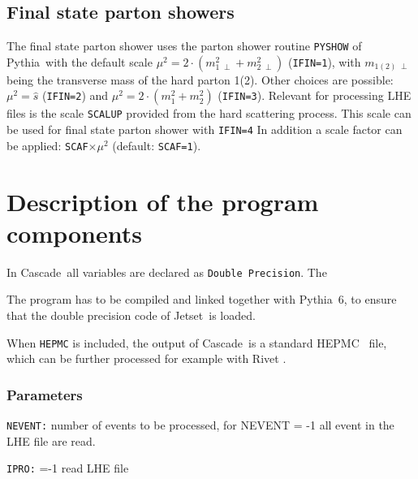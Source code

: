 \documentclass[11pt]{article} \usepackage{mystyle-new}
\newcommand{\deflab}[1]{#1\hfil}%
\newenvironment{defl}[1]%
  {\begin{list}{}{\settowidth{\labelwidth}{#1}%
  \setlength{\leftmargin}{\labelwidth}%
  \addtolength{\leftmargin}{\labelsep}%
  \setlength{\itemsep}{0pt plus 1pt}
  \setlength{\parsep}{0pt plus 1pt}
  \setlength{\topsep}{0pt plus 1pt}
  \setlength{\partopsep}{0pt plus 1pt}
  \setlength{\parskip}{2mm plus 1mm minus 1mm}
  \let\makelabel\deflab}}%
  {\end{list}}
\def\cascade{{\sc Cascade}}
\def\PYTHIA{{\sc Pythia}}
\def\JETSET{{\sc Jetset}}
\begin{document}
\subsection{Final state parton showers}




The final state parton shower uses the parton shower routine \verb+PYSHOW+ 
of \PYTHIA\
with the default scale $\mu^2=2\cdot (m_{1\;\perp}^2+m_{2\;\perp}^2)$ (\verb+IFIN=1+),
with $m_{1(2)\;\perp}$ being the transverse mass of the hard parton 1(2). Other choices are possible: $\mu^2=\hat{s}$ (\verb+IFIN=2+) and $\mu^2=2\cdot (m_1^2+m_2^2)$ (\verb+IFIN=3+). 
Relevant for processing LHE files is the scale \verb+SCALUP+ provided from the hard scattering process. This scale can be used for final state parton shower with \verb+IFIN=4+
In addition a scale factor can be applied: \verb+SCAF+$\times\mu^2 $ (default:  \verb+SCAF=1+).



\section{Description of the program components}
In \cascade\ all variables are declared as \verb"Double Precision". The 

The program has to be compiled and linked together with \PYTHIA\ 6, to ensure that the double
precision code of \JETSET\  is loaded.

When \verb+HEPMC+ is included, the output of \cascade\ is a standard HEPMC~\cite{Dobbs:2001ck} file, which can be further processed
for example with Rivet \cite{Buckley:2010ar}. 


\subsubsection{Parameters}
\begin{defl}{123456789012345}
\item[{\tt NEVENT:}] number of events to be processed, for NEVENT = -1 all event in the LHE file are read.
\item[{\tt IPRO:}]                  =-1  read LHE file
\end{defl}
\end{document}
